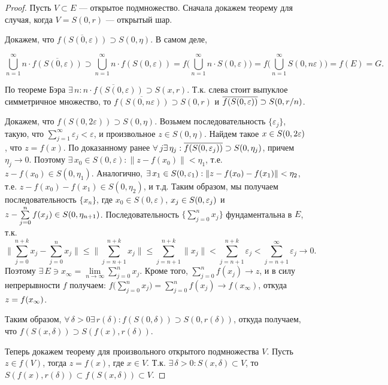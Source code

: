 \documentclass[10pt]{article}
\newcommand*{\p}[1]{#1\nobreak\discretionary{}{\hbox{$\mathsurround=0pt #1$}}{}}
\begin{document}
\begin{proof}
Пусть $V\subset E$ --- открытое подмножество. Сначала докажем
теорему для случая, когда $V=S(0,r)$ --- открытый шар.

Докажем, что $\overline{f(S(0,\varepsilon))}\supset S(0,\eta)$. В
самом деле,

\begin{equation*}
  \bigcup\limits_{n=1}^\infty
  n\cdot\overline{f(S(0,\varepsilon))}\supset\bigcup\limits_{n=1}^\infty
  n\cdot f(S(0,\varepsilon))= f\Big(\bigcup\limits_{n=1}^\infty
  n\cdot S(0,\varepsilon)\Big)=f\Big(\bigcup\limits_{n=1}^\infty
  S(0,n\varepsilon)\Big)=f(E)=G.
\end{equation*}


По теореме Бэра $\exists\,n:\overline{n\cdot
f(S(0,\varepsilon))}\supset S(x,r)$. Т.к. слева стоит выпуклое
симметричное множество, то $\overline{f(S(0,n\varepsilon))}\supset
S(0,r)$ и $\overline{f(S(0,\varepsilon))}\p\supset S(0,r/n)$.

Докажем, что $f(S(0,2\varepsilon))\supset S(0,\eta)$. Возьмем
последовательность $\{\varepsilon_j\}$, такую, что
$\sum\limits_{j=1}^\infty \varepsilon_j<\varepsilon$, и произвольное
$z\in S(0,\eta)$. Найдем такое $x\p\in S(0,2\varepsilon)$, что
$z=f(x)$. По доказанному ранее
$\forall\,j$\;\;$\exists\,\eta_j:\overline{f(S(0,\varepsilon_j))}\p\supset
S(0,\eta_j)$, причем $\eta_j\to 0$. Поэтому $\exists\,x_0\in
S(0,\varepsilon): \|z-f(x_0)\|<\eta_1$, т.е. $z-f(x_0)\in
S(0,\eta_1)$. Аналогично, $\exists\,x_1\in
S(0,\varepsilon_1):\|z-f(x_0)-f(x_1)\|\p<\eta_2$, т.е.
$z-f(x_0)-f(x_1)\in S(0,\eta_2)$, и т.д. Таким образом, мы получаем
последовательность $\{x_n\}$, где $x_0\in S(0,\varepsilon)$,
$x_j\p\in S(0,\varepsilon_j)$ и $z-\sum\limits_{j=0}^nf(x_j)\p\in
S(0,\eta_{n+1})$. Последовательность $\Big\{\sum\limits_{j=0}^n
x_j\Big\}$ фундаментальна в $E$, т.к.
$$\Big\|\sum\limits_{j=0}^{n+k}x_j-\sum\limits_{j=0}^n x_j\Big\|\leqslant
\Big\|\sum\limits_{j=n+1}^{n+k}x_j\Big\|\leqslant\sum\limits_{j=n+1}^{n+k}\|x_j\|
<\sum\limits_{j=n+1}^{n+k}\varepsilon_j<\sum\limits_{j=n+1}^\infty
\varepsilon_j\to 0.$$ Поэтому $\exists\,E\ni
x_\infty=\lim\limits_{n\to\infty}\sum\limits_{j=0}^n x_j$. Кроме
того, $\sum\limits_{j=0}^nf(x_j)\to z$, и в силу непрерывности $f$
получаем: $f\Big(\sum\limits_{j=0}^n
x_j\Big)=\sum\limits_{j=0}^nf(x_j)\to f(x_\infty)$, откуда
$z\p=f(x_\infty)$.

Таким образом,
$\forall\,\delta>0$\;\;$\exists\,r(\delta):f(S(0,\delta))\supset
S(0,r(\delta))$, откуда получаем, что $f(S(x,\delta))\supset
S(f(x),r(\delta))$.

Теперь докажем теорему для произвольного открытого подмножества $V$.
Пусть $z\in f(V)$, тогда $z=f(x)$, где $x\in V$. Т.к.
$\exists\,\delta>0:S(x,\delta)\subset V$, то
$S(f(x),r(\delta))\subset f(S(x,\delta))\subset V$.
\end{proof}
\end{document}
